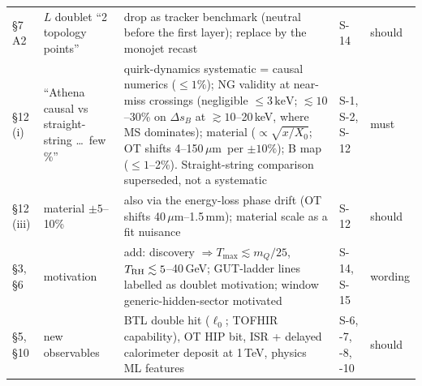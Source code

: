 \documentclass[11pt,a4paper]{article}
\newcommand{\mQ}{m_Q}
\newcommand{\keV}{\ensuremath{\,\mathrm{keV}}}
\newcommand{\um}{\ensuremath{\,\mu\mathrm{m}}}
\newcommand{\Ds}{\Delta s}
\begin{document}
{\begin{longtable}{@{}L{1.9cm}L{3.0cm}L{7.6cm}L{2.0cm}L{1.1cm}@{}}
\S7 A2 & $L$ doublet ``2 topology points'' & drop as tracker benchmark (neutral before the first layer); replace by the monojet recast & S-14 & should\\
\S12 (i) & ``Athena causal vs straight-string \ldots\ few \%'' & quirk-dynamics systematic = causal numerics ($\le1\%$); NG validity at near-miss crossings (negligible $\le3\keV$; $\lesssim10$--30\% on $\Ds_B$ at $\gtrsim10$--20\,keV, where MS dominates); material ($\propto\sqrt{x/X_0}$; OT shifts 4--150\um\ per $\pm10\%$); B map ($\le1$--2\%). Straight-string comparison superseded, not a systematic & S-1, S-2, S-12 & must\\
\S12 (iii) & material $\pm5$--10\% & also via the energy-loss phase drift (OT shifts 40\um--1.5\,mm); material scale as a fit nuisance & S-12 & should\\
\S3, \S6 & motivation & add: discovery $\Rightarrow T_{\max}\lesssim\mQ/25$, $T_{\rm RH}\lesssim5$--40\,GeV; GUT-ladder lines labelled as doublet motivation; window generic-hidden-sector motivated & S-14, S-15 & wording\\
\S5, \S10 & new observables & BTL double hit ($\ell_0$; TOFHIR capability), OT HIP bit, ISR + delayed calorimeter deposit at 1\,TeV, physics ML features & S-6, -7, -8, -10 & should\\
\end{longtable}
}

\end{document}
